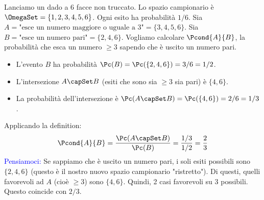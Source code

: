 \begin{example}
Lanciamo un dado a 6 facce non truccato.
Lo spazio campionario è $\OmegaSet = \{1, 2, 3, 4, 5, 6\}$. Ogni esito ha probabilità $1/6$.
Sia $A = \text{"esce un numero maggiore o uguale a 3"} = \{3, 4, 5, 6\}$.
Sia $B = \text{"esce un numero pari"} = \{2, 4, 6\}$.
Vogliamo calcolare $\Pcond{A}{B}$, la probabilità che esca un numero $\ge 3$ sapendo che è uscito un numero pari.

\begin{itemize}
    \item L'evento $B$ ha probabilità $\Pc(B) = \Pc(\{2, 4, 6\}) = 3/6 = 1/2$.
    \item L'intersezione $A \capSet B$ (esiti che sono sia $\ge 3$ sia pari) è $\{4, 6\}$.
    \item La probabilità dell'intersezione è $\Pc(A \capSet B) = \Pc(\{4, 6\}) = 2/6 = 1/3$.
\end{itemize}
Applicando la definition:
\[ \Pcond{A}{B} = \frac{\Pc(A \capSet B)}{\Pc(B)} = \frac{1/3}{1/2} = \frac{2}{3} \]
\textcolor{blue}{Pensiamoci:} Se sappiamo che è uscito un numero pari, i soli esiti possibili sono $\{2, 4, 6\}$ (questo è il nostro nuovo spazio campionario "ristretto"). Di questi, quelli favorevoli ad $A$ (cioè $\ge 3$) sono $\{4, 6\}$. Quindi, 2 casi favorevoli su 3 possibili. Questo coincide con $2/3$.
\end{example}

